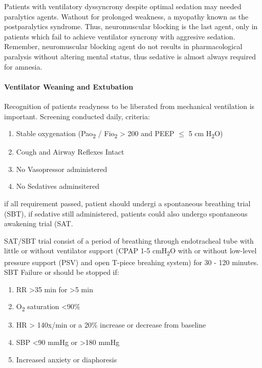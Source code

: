 \documentclass[
  letterpaper,
  DIV=11,
  numbers=noendperiod]{scrreprt}
\let\oldparagraph\paragraph
\renewcommand{\paragraph}[1]{\oldparagraph{#1}\mbox{}}
\providecommand{\tightlist}{%
  \setlength{\itemsep}{0pt}\setlength{\parskip}{0pt}}\usepackage{longtable,booktabs,array}
\begin{document}
Patients with ventilatory dyssyncrony despite optimal sedation may
needed paralytics agents. Wathout for prolonged weakness, a myopathy
known as the postparalytics syndrome. Thus, neuromuscular blocking is
the last agent, only in patients which fail to achieve ventilator
syncrony with aggresive sedation. Remember, neuromuscular blocking agent
do not results in pharmacological paralysis without altering mental
status, thus sedative is almost always required for amnesia.

\paragraph{Ventilator Weaning and
Extubation}\label{ventilator-weaning-and-extubation}

Recognition of patients readyness to be liberated from mechanical
ventilation is important. Screening conducted daily, criteria:

\begin{enumerate}
\def\labelenumi{\arabic{enumi}.}
\tightlist
\item
  Stable oxygenation (Pao\textsubscript{2} / Fio\textsubscript{2}
  \textgreater{} 200 and PEEP \(\le\) 5 cm H\textsubscript{2}O)
\item
  Cough and Airway Reflexes Intact
\item
  No Vasopressor administered
\item
  No Sedatives adminsitered
\end{enumerate}

if all requirement passed, patient should undergi a spontaneous
breathing trial (SBT), if sedative still administered, patients could
also undergo spontaneous awakening trial (SAT.

SAT/SBT trial consist of a period of breathing through endotracheal tube
with little or without ventilator support (CPAP 1-5
cmH\textsubscript{2}O with or without low-level pressure support (PSV)
and open T-piece breahing system) for 30 - 120 minutes. SBT Failure or
should be stopped if:

\begin{enumerate}
\def\labelenumi{\arabic{enumi}.}
\tightlist
\item
  RR \textgreater35 min for \textgreater5 min
\item
  O\textsubscript{2} saturation \textless90\%
\item
  HR \textgreater{} 140x/min or a 20\% increase or decrease from
  baseline
\item
  SBP \textless90 mmHg or \textgreater180 mmHg
\item
  Increased anxiety or diaphoresis
\end{enumerate}
\end{document}
